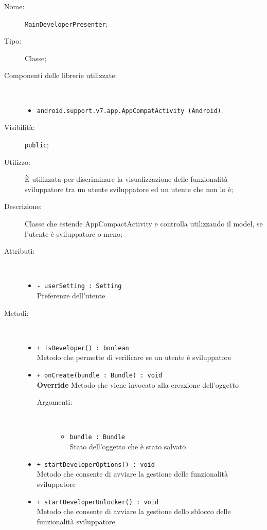 \documentclass[../DefinizioneDiProdotto.tex]{subfiles}
\begin{document}
\begin{description}
	\item[Nome:] \texttt{MainDeveloperPresenter};
	\item[Tipo:] Classe;
	\item[Componenti delle librerie utilizzate:] \
\begin{itemize}
\item \texttt{android.support.v7.app.AppCompatActivity (Android)}.
\end{itemize}
	\item[Visibilità:] \texttt{public};
	\item[Utilizzo:] È utilizzata per discriminare la visualizzazione delle funzionalità sviluppatore tra un utente sviluppatore ed un utente che non lo è;
	\item[Descrizione:] Classe che estende AppCompactActivity e controlla utilizzando il model, se l'utente è sviluppatore o meno;
	\item[Attributi:] \
	\begin{itemize}
		\item \texttt{- userSetting : Setting}\\
		Preferenze dell'utente
		
	\end{itemize}
	\item[Metodi:] \
	\begin{itemize}
		\item \texttt{+ isDeveloper() : boolean}\\
		Metodo che permette di verificare se un utente è sviluppatore
		\item \texttt{+ onCreate(bundle : Bundle) : void}\\
		\textbf{Override} Metodo che viene invocato alla creazione dell'oggetto
		\begin{description}
			\item[Argomenti:] \
			\begin{itemize}
				\item \texttt{bundle : Bundle}\\
				Stato dell'oggetto che è stato salvato\end{itemize}
		\end{description}
		\item \texttt{+ startDeveloperOptions() : void}\\
		Metodo che consente di avviare la gestione delle funzionalità sviluppatore
		\item \texttt{+ startDeveloperUnlocker() : void}\\
		Metodo che consente di avviare la gestione dello sblocco delle funzionalità sviluppatore
	\end{itemize}
\end{description}
\end{document}

